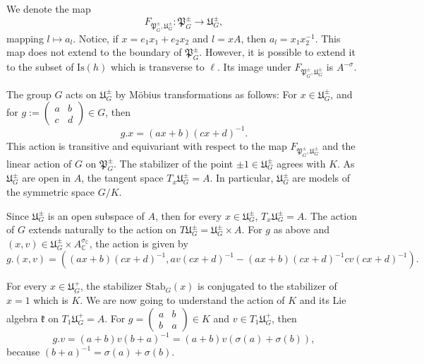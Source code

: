 \documentclass[oneside,11pt]{amsart}
\theoremstyle{definition}
\theoremstyle{remark}
\numberwithin{thm}{section}
\numberwithin{equation}{section}
\begin{document}
We denote the map
\begin{equation}\label{eq:ort_PU}
F_{\mathfrak{P}_G^\pm,\mathfrak{U}_G^\pm}\colon\mathfrak{P}_G^\pm\to\mathfrak{U}_G^\pm,
\end{equation} 
mapping $l\mapsto a_l$. Notice, if $x=e_1x_1+e_2x_2$ and $l=xA$, then $a_l=x_1x_2^{-1}$. This map does not extend to the boundary of $\mathfrak{P}_G^\pm$. However, it is possible to extend it to the subset of $\mathrm{Is}( h)$ which is transverse to $\ell$. Its image under $F_{\mathfrak{P}_G^\pm,\mathfrak{U}_G^\pm}$ is $A^{-\sigma}$.

The group $G$ acts on $\mathfrak{U}_G^\pm$ by M\"obius transformations as follows: For $x\in \mathfrak{U}_G^\pm$, and for $g:=\begin{pmatrix}
    a & b\\
    c & d
\end{pmatrix}\in G$, then \[g.x=(ax+b)(cx+d)^{-1}.\] 
This action is transitive and equivariant with respect to the map $F_{\mathfrak{P}_G^\pm,\mathfrak{U}_G^\pm}$ and the linear action of $G$ on $\mathfrak{P}_G^\pm$. The stabilizer of the point $\pm 1\in \mathfrak{U}_G^\pm$ agrees with $K$. As $\mathfrak{U}_G^\pm$ are open in $A$, the tangent space $T_x\mathfrak{U}_G^\pm=A$. In particular, $\mathfrak{U}_G^\pm$ are models of the symmetric space $G/K$.

Since $\mathfrak U_G^\pm$ is an open subspace of $A$, then for every $x\in \mathfrak U_G^\pm$, $T_x\mathfrak U_G^\pm = A$. The action of $G$ extends naturally to the action on $T\mathfrak U_G^\pm=\mathfrak U_G^\pm\times A$. For $g$ as above and $(x,v)\in \mathfrak U_G^\pm\times A^{\sigma_\mathbb C}_\mathbb C$, the action is given by 
\begin{equation}\label{eq:diff_moebius_U_ortog}
    g.(x,v)=\left((ax+b)(cx+d)^{-1}, av(cx+d)^{-1}-(ax+b)(cx+d)^{-1}cv(cx+d)^{-1}\right).  
\end{equation}

For every $x\in\mathfrak U_G^+$, the stabilizer $\mathrm{Stab}_G(x)$ is conjugated to the stabilizer of $x=1$ which is $K$. We are now going to understand the action of $K$ and its Lie algebra $\mathfrak k$ on $T_1\mathfrak U_G^+= A$. For $g=\begin{pmatrix}
    a & b \\
    b & a
\end{pmatrix}\in K$ and $v\in T_1\mathfrak U_G^+$, then
$$g.v
=(a+b)v(b+a)^{-1}
=(a+b)v(\sigma(a)+\sigma(b)),$$
because $(b+a)^{-1}=\sigma(a)+\sigma(b)$.
\end{document}
